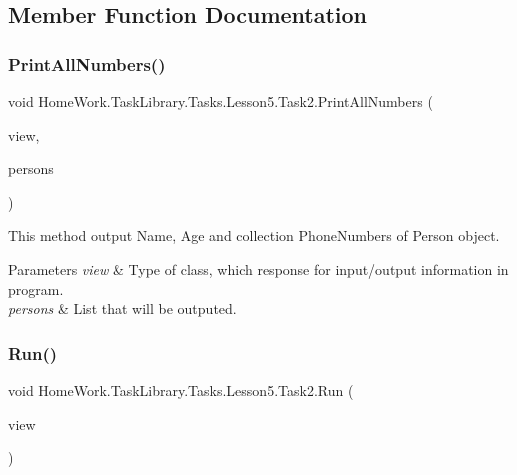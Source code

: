 \subsection{Member Function Documentation}
\mbox{\label{class_home_work_1_1_task_library_1_1_tasks_1_1_lesson5_1_1_task2_ae44de76c02373304b0e2781726497adb}} 
\subsubsection{\texorpdfstring{PrintAllNumbers()}{PrintAllNumbers()}}
{\footnotesize\ttfamily void Home\+Work.\+Task\+Library.\+Tasks.\+Lesson5.\+Task2.\+Print\+All\+Numbers (\begin{DoxyParamCaption}\item[{I\+Information}]{view,  }\item[{List$<$ \mbox{\hyperlink{class_home_work_1_1_task_library_1_1_tasks_1_1_lesson5_1_1_classes_1_1_person}{Person}} $>$}]{persons }\end{DoxyParamCaption})\hspace{0.3cm}{\ttfamily [private]}}



This method output Name, Age and collection Phone\+Numbers of Person object. 


\begin{DoxyParams}{Parameters}
{\em view} & Type of class, which response for input/output information in program.\\
\hline
{\em persons} & List that will be outputed.\\
\hline
\end{DoxyParams}
\mbox{\label{class_home_work_1_1_task_library_1_1_tasks_1_1_lesson5_1_1_task2_a6f882c39e297740775a0e5ccecc51f8b}} 
\subsubsection{\texorpdfstring{Run()}{Run()}}
{\footnotesize\ttfamily void Home\+Work.\+Task\+Library.\+Tasks.\+Lesson5.\+Task2.\+Run (\begin{DoxyParamCaption}\item[{I\+Information}]{view }\end{DoxyParamCaption})}



